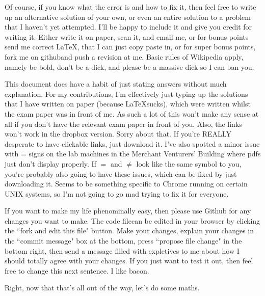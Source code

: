 \documentclass{article}
\begin{document}
Of course, if you know what the error is and how to fix it, then feel free to
write up an alternative solution of your own, or even an entire solution to a
problem that I haven't yet attempted. I'll be happy to include it and give you
credit for writing it. Either write it on paper, scan it, and email
me\footnotemark[1], or for bonus points send me correct \LaTeX, that I can just
copy paste in, or for super bonus points, fork me on
github\footnotemark[4]
and push a revision at me. Basic rules of Wikipedia apply, namely be bold, don't
be a dick, and please be a massive dick so I can ban you.

This document does have a habit of just stating answers without much
explanation. For my contributions, I'm effectively just typing up the solutions
that I have written on paper (because \LaTeX sucks), which were written whilst
the exam paper was in front of me. As such a lot of this won't make any sense at
all if you don't have the relevant exam paper in front of you. Also, the links
won't work in the dropbox version. Sorry about that. If you're REALLY desperate
to have clickable links, just download it. I've also spotted a minor issue with
= signs on the lab machines in the Merchant Venturers' Building where pdfs just
don't display properly. If $=$ and $\neq$ look like the same symbol to you,
you're probably also going to have these issues, which can be fixed by just
downloading it. Seems to be something specific to Chrome running on certain UNIX
systems, so I'm not going to go mad trying to fix it for everyone.

If you want to make my life phenominally easy, then please use Github for any
changes you want to make. The code file\footnotemark[4] can be edited in your
browser by clicking the ``fork and edit this file" button. Make your changes,
explain your changes in the ``commit
message" box at the bottom, press ``propose file change" in the bottom right,
then send a message filled with expletives to me about how I should totally
agree with your changes. If you just want to test it out, then feel free to
change this next sentence. I like bacon.

Right, now that that's all out of the way, let's do some maths.

\clearpage
\end{document}

